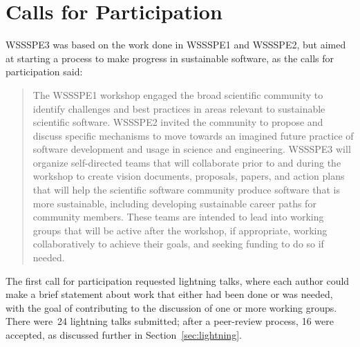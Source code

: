 \documentclass[11pt, oneside]{amsart}
\begin{document}
\section{Calls for Participation} \label{sec:preworkshop}

WSSSPE3 was based on the work done in WSSSPE1 and WSSSPE2, but aimed at starting
a process to make progress in sustainable software, as the calls for
participation said:

\begin{quote} The WSSSPE1 workshop engaged the broad scientific community to
identify challenges and best practices in areas relevant to sustainable
scientific software. WSSSPE2 invited the community to propose and discuss
specific mechanisms to move towards an imagined future practice of software
development and usage in science and engineering. WSSSPE3 will organize
self-directed teams that will collaborate prior to and during the workshop to
create vision documents, proposals, papers, and action plans that will help the
scientific software community produce software that is more sustainable,
including developing sustainable career paths for community members. These teams
are intended to lead into working groups that will be active after the workshop,
if appropriate, working collaboratively to achieve their goals, and seeking
funding to do so if needed. \end{quote}

The first call for participation requested lightning talks, where each author
could make a brief statement about work that either had been done or was needed,
with the goal of contributing to the discussion of one or more working groups.
There were~24 lightning talks submitted; after a peer-review process, 16 
were accepted, as discussed further in Section~\ref{sec:lightning}.
\end{document}
